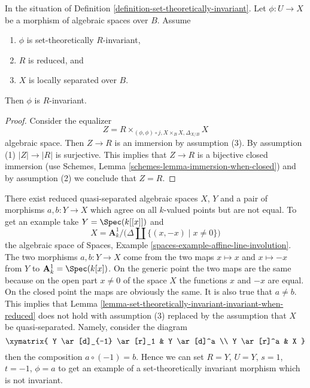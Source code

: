 \begin{lemma}
\label{lemma-set-theoretically-invariant-invariant-when-reduced}
In the situation of Definition \ref{definition-set-theoretically-invariant}.
Let $\phi : U \to X$ be a morphism of algebraic spaces over $B$.
Assume
\begin{enumerate}
\item $\phi$ is set-theoretically $R$-invariant,
\item $R$ is reduced, and
\item $X$ is locally separated over $B$.
\end{enumerate}
Then $\phi$ is $R$-invariant.
\end{lemma}

\begin{proof}
Consider the equalizer
$$
Z = R \times_{(\phi, \phi) \circ j, X \times_B X, \Delta_{X/B}} X
$$
algebraic space. Then $Z \to R$ is an immersion by assumption (3).
By assumption (1) $|Z| \to |R|$ is surjective. This implies that
$Z \to R$ is a bijective closed immersion (use
Schemes, Lemma \ref{schemes-lemma-immersion-when-closed})
and by assumption (2) we conclude that $Z = R$.
\end{proof}

\begin{example}
\label{example-not-invariant}
There exist reduced quasi-separated algebraic spaces $X$, $Y$ and a pair of
morphisms $a, b : Y \to X$ which agree on all $k$-valued points but are not
equal. To get an example take $Y = \Spec(k[[x]])$ and
$$
X = \mathbf{A}^1_k \Big/ \big(\Delta \amalg \{(x, -x) \mid x \not = 0\}\big)
$$
the algebraic space of
Spaces, Example \ref{spaces-example-affine-line-involution}.
The two morphisms $a, b : Y \to X$
come from the two maps $x \mapsto x$ and $x \mapsto -x$
from $Y$ to $\mathbf{A}^1_k = \Spec(k[x])$. On the generic point
the two maps are the same because on the open part $x \not = 0$ of the
space $X$ the functions $x$ and $-x$ are equal. On the closed point
the maps are obviously the same. It is also true that $a \not = b$.
This implies that
Lemma \ref{lemma-set-theoretically-invariant-invariant-when-reduced}
does not hold with assumption (3) replaced by the assumption that $X$
be quasi-separated. Namely, consider the diagram
$$
\xymatrix{
Y \ar[d]_{-1} \ar[r]_1 & Y \ar[d]^a \\
Y \ar[r]^a & X
}
$$
then the composition $a \circ (-1) = b$. Hence we can set $R = Y$,
$U = Y$, $s = 1$, $t = -1$, $\phi = a$ to get an example of a set-theoretically
invariant morphism which is not invariant.
\end{example}

